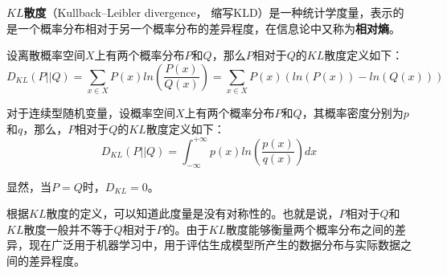 

\textbf{$KL$散度}（Kullback–Leibler divergence， 缩写KLD）是一种统计学度量，表示的是一个概率分布相对于另一个概率分布的差异程度，在信息论中又称为\textbf{相对熵}。

设离散概率空间$X$上有两个概率分布$P$和$Q$，那么$P$相对于$Q$的$KL$散度定义如下：
\begin{equation}
D_{KL}(P||Q)=\sum_{x\in X}P(x)ln(\frac{P(x)}{Q(x)})=\sum_{x\in X}P(x)(ln(P(x))-ln(Q(x)))
\end{equation}

对于连续型随机变量，设概率空间$X$上有两个概率分布$P$和$Q$，其概率密度分别为$p$和$q$，那么，$P$相对于$Q$的$KL$散度定义如下：
\begin{equation}
D_{KL}(P||Q)=\int_{-\infty}^{+\infty}p(x)ln(\frac{p(x)}{q(x)})dx
\end{equation}

显然，当$P=Q$时，$D_{KL}=0$。

根据$KL$散度的定义，可以知道此度量是没有对称性的。也就是说，$P$相对于$Q$和$KL$散度一般并不等于$Q$相对于$P$的。由于$KL$散度能够衡量两个概率分布之间的差异，现在广泛用于机器学习中，用于评估生成模型所产生的数据分布与实际数据之间的差异程度。